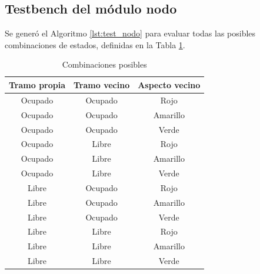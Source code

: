 	\subsection{Testbench del módulo nodo}
			
			Se generó el Algoritmo \ref{lst:test_nodo} para evaluar todas las posibles combinaciones de estados, definidas en la Tabla \ref{tabla_nodos}.
			
			
			\begin{table}[!hbt]
			\renewcommand{\arraystretch}{1.3}
			\caption{Combinaciones posibles}
			\label{tabla_nodos}
			\centering
			\begin{tabular}{ c  c  c }
			\hline
			Tramo propia & Tramo vecino & Aspecto vecino \\	
			\hline
			Ocupado & Ocupado & Rojo  \\
			Ocupado & Ocupado & Amarillo  \\
			Ocupado & Ocupado & Verde  \\	
			Ocupado & Libre & Rojo  \\
			Ocupado & Libre & Amarillo  \\
			Ocupado & Libre & Verde  \\	
			Libre & Ocupado & Rojo  \\
			Libre & Ocupado & Amarillo  \\
			Libre & Ocupado & Verde  \\	
			Libre & Libre & Rojo  \\
			Libre & Libre & Amarillo  \\
			Libre & Libre & Verde  \\	
			\end{tabular}
			\end{table}	
	
